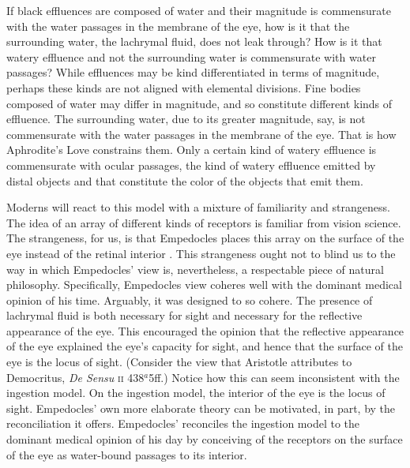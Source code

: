 If black effluences are composed of water and their magnitude is commensurate with the water passages in the membrane of the eye, how is it that the surrounding water, the lachrymal fluid, does not leak through? How is it that watery effluence and not the surrounding water is commensurate with water passages? While effluences may be kind differentiated in terms of magnitude, perhaps these kinds are not aligned with elemental divisions. Fine bodies composed of water may differ in magnitude, and so constitute different kinds of effluence. The surrounding water, due to its greater magnitude, say, is not commensurate with the water passages in the membrane of the eye. That is how Aphrodite's Love constrains them. Only a certain kind of watery effluence is commensurate with ocular passages, the kind of watery effluence emitted by distal objects and that constitute the color of the objects that emit them. 

Moderns will react to this model with a mixture of familiarity and strangeness. The idea of an array of different kinds of receptors is familiar from vision science. The strangeness, for us, is that Empedocles places this array on the surface of the eye instead of the retinal interior \citep[for a comparison of Empedocles' theory with modern theories of vision see][]{Siegel:1959fk}. This strangeness ought not to blind us to the way in which Empedocles' view is, nevertheless, a respectable piece of natural philosophy. Specifically, Empedocles view coheres well with the dominant medical opinion of his time. Arguably, it was designed to so cohere. The presence of lachrymal fluid is both necessary for sight and necessary for the reflective appearance of the eye. This encouraged the opinion that the reflective appearance of the eye explained the eye's capacity for sight, and hence that the surface of the eye is the locus of sight. (Consider the view that Aristotle attributes to Democritus, \emph{De Sensu} \textsc{ii} 438\( ^{a} \)5ff.) Notice how this can seem inconsistent with the ingestion model. On the ingestion model, the interior of the eye is the locus of sight. Empedocles' own more elaborate theory can be motivated, in part, by the reconciliation it offers. Empedocles' reconciles the ingestion model to the dominant medical opinion of his day by conceiving of the receptors on the surface of the eye as water-bound passages to its interior.

